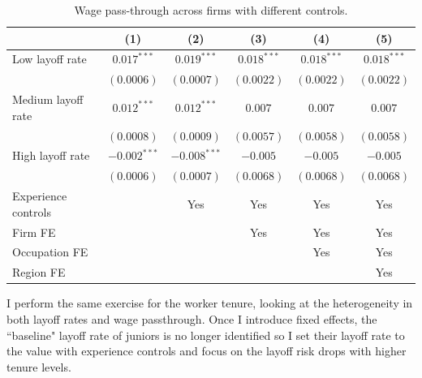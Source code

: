\begin{table}[h!]
  \centering
  \begin{tabular}{lccccc}
    \hline
    & (1) & (2) & (3) & (4) & (5)  \\
    \midrule
    \hline
    Low layoff rate      &  $0.017^{***}$  &  $0.019^{***}$    &  $0.018^{***}$    &  $0.018^{***}$        &  $0.018^{***}$       \\  
                         &  $(0.0006)$     &  $(0.0007)$       &  $(0.0022)$       &  $(0.0022)$           & $(0.0022)$        \\
    
    Medium layoff rate   &  $0.012^{***}$  &  $0.012^{***}$    &  $0.007$    &  $0.007$        &  $0.007$       \\  
                         &  $(0.0008)$     &  $(0.0009)$       &  $(0.0057)$       &  $(0.0058)$           & $(0.0058)$        \\

    High layoff rate     &  $-0.002^{***}$  &  $-0.008^{***}$    &  $-0.005$    &  $-0.005$        &  $-0.005$       \\  
                         &  $(0.0006)$     &  $(0.0007)$       &  $(0.0068)$       &  $(0.0068)$           & $(0.0068)$        \\
    \hline
    \hline
    Experience controls   &                & Yes            & Yes            & Yes            & Yes            \\
    Firm FE               &                &                & Yes            & Yes            & Yes            \\
    Occupation FE         &                &                &                & Yes            & Yes            \\
    Region FE             &                &                &                &                & Yes            \\
    \hline
  \end{tabular}
  \caption{Wage pass-through across firms with different controls.}
  \label{tab:controls_firms}
\end{table}
I perform the same exercise for the worker tenure, looking at the heterogeneity in both layoff rates and wage passthrough. Once I introduce fixed effects, the ``baseline" layoff rate of juniors is no longer identified so I set their layoff rate to the value with experience controls and focus on the layoff risk drops with higher tenure levels. 

